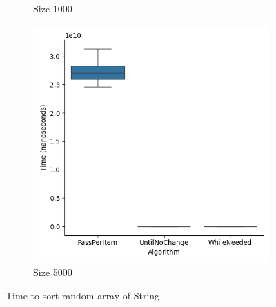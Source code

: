\documentclass{article}
\begin{document}
\begin{figure}[ht]
\begin{subfigure}{0.3\textwidth}
    \caption{Size 1000}
    \label{fig:img2}
  \end{subfigure}
  \begin{subfigure}{0.3\textwidth}
    \centering
    \includegraphics[width=\linewidth]{../figureStringRandom5000.png}
    \caption{Size 5000}
    \label{fig:img3}
  \end{subfigure}
  \caption{Time to sort random array of String}
  \label{fig:three_images}
\end{figure}
\end{document}
